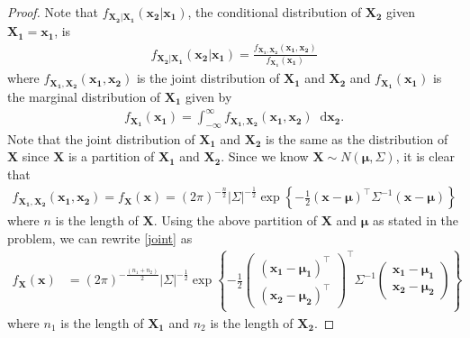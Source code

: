 \documentclass[12pt]{article}
\theoremstyle{definition}
\newcommand*\diff{\mathop{}\!\mathrm{d}}
\newcommand{\vect}[1]{\boldsymbol{#1}}
\begin{document}
\begin{proof}
   Note that $f_{\vect{X_2}|\vect{X_1}}(\vect{x_2}|\vect{x_1})$, the conditional
   distribution of $\vect{X_2}$ given $\vect{X_1} = \vect{x_1}$, is
   \begin{align}\label{conditional}
     f_{\vect{X_2}|\vect{X_1}}(\vect{x_2}|\vect{x_1}) = \frac{f_{\vect{X_1}, \vect{X_2}}(\vect{x_1}, \vect{x_2})}{f_{\vect{X_1}}(\vect{x_1})}
   \end{align}
   where $f_{\vect{X_1}, \vect{X_2}}(\vect{x_1}, \vect{x_2})$ is the joint distribution
   of $\vect{X_1}$ and $\vect{X_2}$ and $f_{\vect{X_1}}(\vect{x_1})$ is the
   marginal distribution of $\vect{X_1}$ given by
   \begin{align}\label{marginal}
     f_{\vect{X_1}}(\vect{x_1}) = \int_{-\infty}^\infty f_{\vect{X_1}, \vect{X_2}}(\vect{x_1}, \vect{x_2}) \diff \vect{x_2}.
   \end{align}
   Note that the joint distribution of $\vect{X_1}$ and $\vect{X_2}$ is the
   same as the distribution of $\vect{X}$ since $\vect{X}$ is a partition of
   $\vect{X_1}$ and $\vect{X_2}$. Since we know  $\vect{X} \sim N(\vect{\mu}, \Sigma)$,
   it is clear that
   \begin{align}\label{joint}
     f_{\vect{X_1}, \vect{X_2}}(\vect{x_1}, \vect{x_2}) = f_{\vect{X}}(\vect{x}) = (2\pi) ^ {-\frac{n}{2}} \left|\Sigma\right|^{-\frac{1}{2}} \exp{\left\{-\frac{1}{2}(\vect{x} - \vect{\mu})^\intercal \Sigma ^{-1} (\vect{x} - \vect{\mu})\right\}}
   \end{align}
   where $n$ is the length of $\vect{X}$. Using the above partition of
   $\vect{X}$ and $\vect{\mu}$ as stated in the problem, we can rewrite
   \eqref{joint} as
   \begin{align}\label{partition_joint}
     f_{\vect{X}}(\vect{x})
     &= (2\pi) ^ {-\frac{(n_1 + n_2)}{2}} \left| \Sigma  \right|^{-\frac{1}{2}} \exp{\left\{-\frac{1}{2}\begin{pmatrix} (\vect{x_1} - \vect{\mu_1})^\intercal \\ (\vect{x_2} - \vect{\mu_2})^\intercal \end{pmatrix}^\intercal \Sigma ^{-1} \begin{pmatrix}\vect{x_1} - \vect{\mu_1} \\ \vect{x_2} - \vect{\mu_2} \end{pmatrix} \right\}}
   \end{align}
   where $n_1$ is the length of $\vect{X_1}$ and $n_2$ is the length of
   $\vect{X_2}$.


\end{proof}
\end{document}
